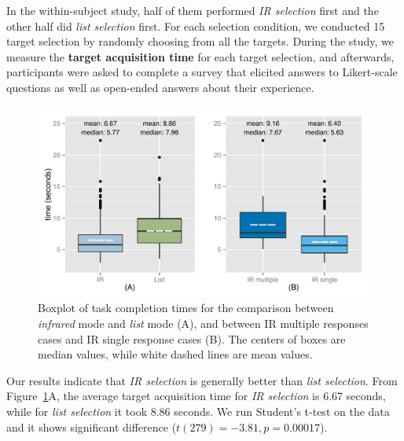 In the within-subject study, half of them performed {\em IR selection} first and the other half did {\em list selection} first. For each selection condition, we conducted 15 target selection by randomly choosing from all the targets. During the study, we measure the {\bf target acquisition time} for each target selection, and afterwards, participants were asked to complete a survey that elicited answers to Likert-scale questions as well as open-ended answers about their experience.


\begin{figure}[t]
\centering
\includegraphics[width=1.0\columnwidth]{figures/R_time_by_Category.pdf}
\caption{Boxplot of task completion times for the comparison between {\em infrared} mode and {\em list} mode (A), and between IR multiple responses cases and IR single response cases (B). The centers of boxes are median values, while white dashed lines are mean values.}
\label{fig:selection-time}
\end{figure}

Our results indicate that {\em IR selection} is generally better than {\em list selection}. From Figure~\ref{fig:selection-time}A, the average target acquisition time for {\em IR selection} is 6.67 seconds, while for {\em list selection} it took 8.86 seconds. We run Student's t-test on the data and it shows significant difference ($t(279)=-3.81, p=0.00017$).

